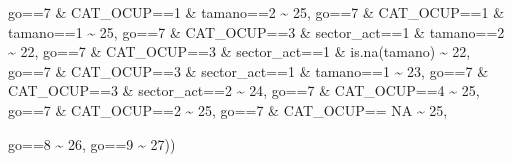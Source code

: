 \documentclass[
]{book}
\newenvironment{Shaded}{\begin{snugshade}}{\end{snugshade}}
\newcommand{\ConstantTok}[1]{\textcolor[rgb]{0.00,0.00,0.00}{#1}}
\newcommand{\DecValTok}[1]{\textcolor[rgb]{0.00,0.00,0.81}{#1}}
\newcommand{\FunctionTok}[1]{\textcolor[rgb]{0.00,0.00,0.00}{#1}}
\newcommand{\NormalTok}[1]{#1}
\newcommand{\SpecialCharTok}[1]{\textcolor[rgb]{0.00,0.00,0.00}{#1}}
\begin{document}
\begin{Shaded}
\begin{Highlighting}[]
\NormalTok{                               go}\SpecialCharTok{==}\DecValTok{7} \SpecialCharTok{\&}\NormalTok{ CAT\_OCUP}\SpecialCharTok{==}\DecValTok{1} \SpecialCharTok{\&}\NormalTok{ tamano}\SpecialCharTok{==}\DecValTok{2}  \SpecialCharTok{\textasciitilde{}} \DecValTok{25}\NormalTok{,}
\NormalTok{                               go}\SpecialCharTok{==}\DecValTok{7} \SpecialCharTok{\&}\NormalTok{ CAT\_OCUP}\SpecialCharTok{==}\DecValTok{1} \SpecialCharTok{\&}\NormalTok{ tamano}\SpecialCharTok{==}\DecValTok{1}  \SpecialCharTok{\textasciitilde{}} \DecValTok{25}\NormalTok{,}
\NormalTok{                               go}\SpecialCharTok{==}\DecValTok{7} \SpecialCharTok{\&}\NormalTok{ CAT\_OCUP}\SpecialCharTok{==}\DecValTok{3} \SpecialCharTok{\&}\NormalTok{ sector\_act}\SpecialCharTok{==}\DecValTok{1} \SpecialCharTok{\&}\NormalTok{ tamano}\SpecialCharTok{==}\DecValTok{2}  \SpecialCharTok{\textasciitilde{}} \DecValTok{22}\NormalTok{,}
\NormalTok{                               go}\SpecialCharTok{==}\DecValTok{7} \SpecialCharTok{\&}\NormalTok{ CAT\_OCUP}\SpecialCharTok{==}\DecValTok{3} \SpecialCharTok{\&}\NormalTok{ sector\_act}\SpecialCharTok{==}\DecValTok{1} \SpecialCharTok{\&} \FunctionTok{is.na}\NormalTok{(tamano) }\SpecialCharTok{\textasciitilde{}} \DecValTok{22}\NormalTok{,}
\NormalTok{                               go}\SpecialCharTok{==}\DecValTok{7} \SpecialCharTok{\&}\NormalTok{ CAT\_OCUP}\SpecialCharTok{==}\DecValTok{3} \SpecialCharTok{\&}\NormalTok{ sector\_act}\SpecialCharTok{==}\DecValTok{1} \SpecialCharTok{\&}\NormalTok{ tamano}\SpecialCharTok{==}\DecValTok{1}  \SpecialCharTok{\textasciitilde{}} \DecValTok{23}\NormalTok{,}
\NormalTok{                               go}\SpecialCharTok{==}\DecValTok{7} \SpecialCharTok{\&}\NormalTok{ CAT\_OCUP}\SpecialCharTok{==}\DecValTok{3} \SpecialCharTok{\&}\NormalTok{ sector\_act}\SpecialCharTok{==}\DecValTok{2}  \SpecialCharTok{\textasciitilde{}} \DecValTok{24}\NormalTok{,}
\NormalTok{                               go}\SpecialCharTok{==}\DecValTok{7} \SpecialCharTok{\&}\NormalTok{ CAT\_OCUP}\SpecialCharTok{==}\DecValTok{4}  \SpecialCharTok{\textasciitilde{}} \DecValTok{25}\NormalTok{,}
\NormalTok{                               go}\SpecialCharTok{==}\DecValTok{7} \SpecialCharTok{\&}\NormalTok{ CAT\_OCUP}\SpecialCharTok{==}\DecValTok{2}  \SpecialCharTok{\textasciitilde{}} \DecValTok{25}\NormalTok{,}
\NormalTok{                               go}\SpecialCharTok{==}\DecValTok{7} \SpecialCharTok{\&}\NormalTok{ CAT\_OCUP}\SpecialCharTok{==} \ConstantTok{NA}    \SpecialCharTok{\textasciitilde{}} \DecValTok{25}\NormalTok{,}
                              
\NormalTok{                            go}\SpecialCharTok{==}\DecValTok{8} \SpecialCharTok{\textasciitilde{}} \DecValTok{26}\NormalTok{,}
\NormalTok{                            go}\SpecialCharTok{==}\DecValTok{9}   \SpecialCharTok{\textasciitilde{}} \DecValTok{27}\NormalTok{))}
\end{Highlighting}
\end{Shaded}
\end{document}
